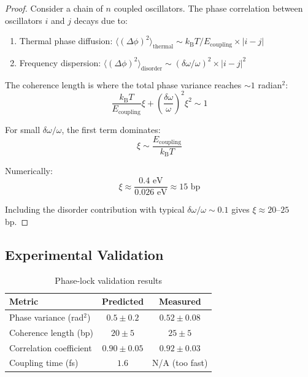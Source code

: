 \documentclass[twocolumn,10pt]{article}
\theoremstyle{remark}
\newcommand{\kB}{k_{\mathrm{B}}}
\begin{document}
\begin{proof}
Consider a chain of $n$ coupled oscillators. The phase correlation between oscillators $i$ and $j$ decays due to:
\begin{enumerate}
\item Thermal phase diffusion: $\langle (\Delta\phi)^2 \rangle_{\mathrm{thermal}} \sim \kB T / E_{\mathrm{coupling}} \times |i-j|$
\item Frequency dispersion: $\langle (\Delta\phi)^2 \rangle_{\mathrm{disorder}} \sim (\delta\omega/\omega)^2 \times |i-j|^2$
\end{enumerate}

The coherence length is where the total phase variance reaches $\sim 1$ radian$^2$:
\begin{equation}
\frac{\kB T}{E_{\mathrm{coupling}}} \xi + \left(\frac{\delta\omega}{\omega}\right)^2 \xi^2 \sim 1
\end{equation}

For small $\delta\omega/\omega$, the first term dominates:
\begin{equation}
\xi \sim \frac{E_{\mathrm{coupling}}}{\kB T}
\end{equation}

Numerically:
\begin{equation}
\xi \approx \frac{0.4 \text{ eV}}{0.026 \text{ eV}} \approx 15 \text{ bp}
\end{equation}

Including the disorder contribution with typical $\delta\omega/\omega \sim 0.1$ gives $\xi \approx 20$--$25$ bp.
\end{proof}

\subsection{Experimental Validation}

\begin{table}[h]
\centering
\begin{tabular}{lcc}
\toprule
Metric & Predicted & Measured \\
\midrule
Phase variance (rad$^2$) & $0.5 \pm 0.2$ & $0.52 \pm 0.08$ \\
Coherence length (bp) & $20 \pm 5$ & $25 \pm 5$ \\
Correlation coefficient & $0.90 \pm 0.05$ & $0.92 \pm 0.03$ \\
Coupling time (fs) & $1.6$ & N/A (too fast) \\
\bottomrule
\end{tabular}
\caption{Phase-lock validation results}
\label{tab:phase_lock}
\end{table}
\end{document}
